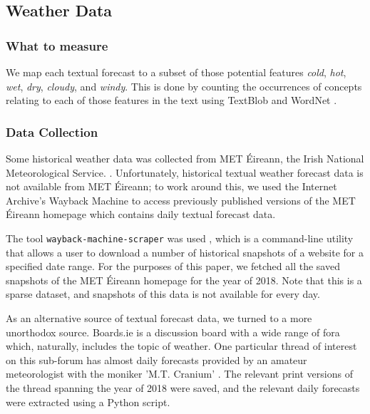 \documentclass[a4paper,10pt]{article}
\begin{document}
    \subsection{Weather Data}

    \subsubsection{What to measure}

    We map each textual forecast to a subset of those potential features \textit{cold}, \textit{hot}, \textit{wet}, \textit{dry}, \textit{cloudy}, and \textit{windy}. This is done by counting the occurrences of concepts relating to each of those features in the text using TextBlob  and WordNet .

    \subsubsection{Data Collection}

    Some historical weather data was collected from MET \'{E}ireann, the Irish National Meteorological Service. . Unfortunately, historical textual weather forecast data is not available from MET \'{E}ireann; to work around this, we used the Internet Archive's Wayback Machine  to access previously published versions of the MET \'{E}ireann homepage which contains daily textual forecast data.

    The tool \texttt{wayback-machine-scraper} was used , which is a command-line utility that allows a user to download a number of historical snapshots of a website for a specified date range. For the purposes of this paper, we fetched all the saved snapshots of the MET \'{E}ireann homepage for the year of 2018. Note that this is a sparse dataset, and snapshots of this data is not available for every day.

    As an alternative source of textual forecast data, we turned to a more unorthodox source. Boards.ie is a discussion board with a wide range of fora which, naturally, includes the topic of weather. One particular thread of interest on this sub-forum has almost daily forecasts provided by an amateur meteorologist with the moniker 'M.T. Cranium' . The relevant print versions of the thread spanning the year of 2018 were saved, and the relevant daily forecasts were extracted using a Python script. 
\end{document}
